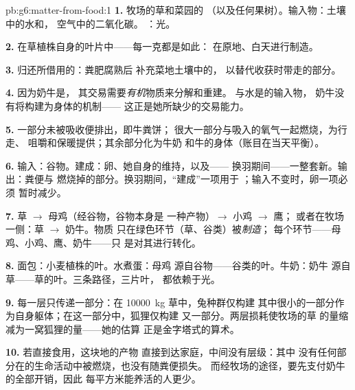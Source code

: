 \begin{solution}{pb:g6:matter-from-food:1}
\textbf{1.} 牧场的草和菜园的
（以及任何果树）。输入物：土壤中的水和，
空气中的二氧化碳。
：光。

\textbf{2.} 在草植株自身的叶片中——每一克都是如此：
在原地、白天进行制造。

\textbf{3.} 归还所借用的：粪肥腐熟后
补充菜地土壤中的，
以替代收获时带走的部分。

\textbf{4.} 因为奶牛是，
其交易需要\emph{有机}物质来分解和重建。
与水是的输入物，
奶牛没有将构建为身体的机制——
这正是她所缺少的交易能力。

\textbf{5.} 一部分未被吸收便排出，即牛粪饼；
很大一部分与吸入的氧气一起燃烧，为行走、
咀嚼和保暖提供；其余部分化为牛奶
和牛的身体（账目在当天平衡）。

\textbf{6.} 输入：谷物。建成：卵、她自身的维持，以及——
换羽期间——一整套新。输出：粪便与
燃烧掉的部分。换羽期间，“建成”一项用于
；输入不变时，卵一项必须
暂时减少。

\textbf{7.} 草 $\rightarrow$ 母鸡（经谷物，谷物本身是
一种产物）$\rightarrow$ 小鸡 $\rightarrow$ 鹰；
或者在牧场一侧：草 $\rightarrow$ 奶牛。物质
只在绿色环节（草、谷类）被\emph{制造}；
每个环节——母鸡、小鸡、鹰、奶牛——只
是对其进行转化。

\textbf{8.} 面包：小麦植株的叶。水煮蛋：母鸡
源自谷物——谷类的叶。牛奶：奶牛
源自草——草的叶。三条路径，三片叶，
都依赖于光。

\textbf{9.} 每一层只传递一部分：在
\qty{10000}{kg} 草中，兔种群仅构建
其中很小的一部分作为自身躯体；在这一部分中，狐狸仅构建
又一部分。两层损耗使牧场的草
的量缩减为一窝狐狸的量——她的估算
正是金字塔式的算术。

\textbf{10.} 若直接食用，这块地的产物
直接到达家庭，中间没有层级：其中
没有任何部分在的生命活动中被燃烧，也没有随粪便损失。
而经牧场的途径，要先支付奶牛的全部开销，因此
每平方米能养活的人更少。


\end{solution}
